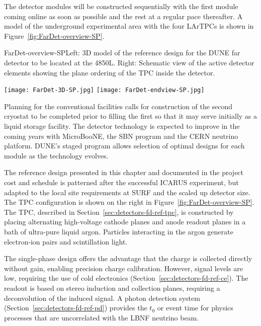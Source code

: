 The detector modules will be constructed sequentially
with the first module coming online as soon as possible and the rest
at a regular pace thereafter. A model of the underground experimental area with
the four  LArTPCs is shown in
Figure~\ref{fig:FarDet-overview-SP}. 
\begin{cdrfigure}{FarDet-overview-SP}{Left: 3D model of the reference design for the DUNE far detector to be located at the 4850L. Right: Schematic view of the active detector elements showing the plane ordering of the TPC inside the detector.}
\centering
\begin{minipage}[b]{1.0\textwidth}
\begin{center}
\texttt{[image: FarDet-3D-SP.jpg]}
\texttt{[image: FarDet-endview-SP.jpg]}
\end{center}
\end{minipage}
\end{cdrfigure}
Planning for the conventional facilities calls for construction of the
second cryostat to be completed prior to filling the first so that it
may serve initially as a liquid storage facility.  The detector
technology is expected to improve in the coming years with MicroBooNE,
the SBN program and the CERN neutrino platform.  DUNE's staged program
allows selection of optimal designs for each module as the technology
evolves.


The reference design presented in this chapter and documented in the
project cost and schedule is patterned after the successful ICARUS
experiment, but adapted to the local site requirements at SURF and the
scaled up detector size.  The TPC configuration is shown on the right
in Figure~\ref{fig:FarDet-overview-SP}.  The TPC, described in
Section~\ref{sec:detectors-fd-ref-tpc}, is constructed by placing
alternating high-voltage cathode planes and anode readout planes in a
bath of ultra-pure liquid argon. Particles interacting in the argon
generate electron-ion pairs and scintillation light.

The single-phase design offers the advantage that the charge is
collected directly without gain, enabling precision charge
calibration. However, signal levels are low, requiring the use of cold
electronics (Section~\ref{sec:detectors-fd-ref-ce}). The readout is
based on stereo induction and collection planes, requiring a
deconvolution of the induced signal. A photon detection system
(Section~\ref{sec:detectors-fd-ref-pd}) provides the $t_0$ or event
time for physics processes that are uncorrelated with the LBNF
neutrino beam.

